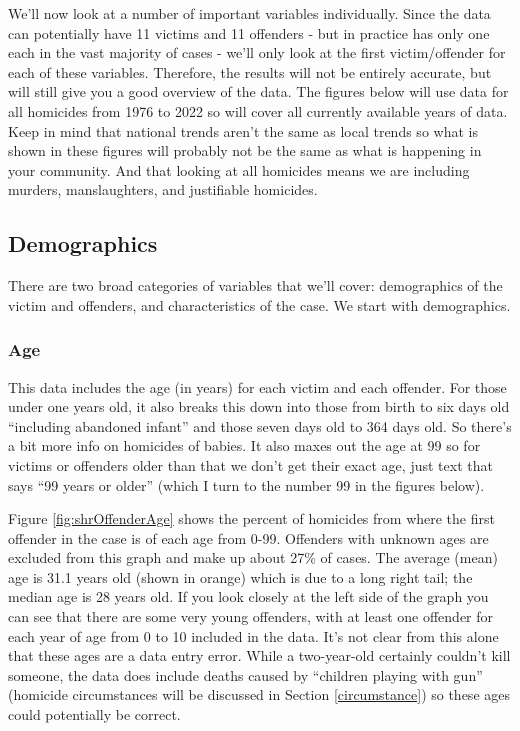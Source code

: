 \documentclass[
  12pt,
  openany]{book}
\begin{document}
We'll now look at a number of important variables individually. Since the data can potentially have 11 victims and 11 offenders - but in practice has only one each in the vast majority of cases - we'll only look at the first victim/offender for each of these variables. Therefore, the results will not be entirely accurate, but will still give you a good overview of the data. The figures below will use data for all homicides from 1976 to 2022 so will cover all currently available years of data. Keep in mind that national trends aren't the same as local trends so what is shown in these figures will probably not be the same as what is happening in your community. And that looking at all homicides means we are including murders, manslaughters, and justifiable homicides.

\subsection{Demographics}\label{demographics}

There are two broad categories of variables that we'll cover: demographics of the victim and offenders, and characteristics of the case. We start with demographics.

\subsubsection{Age}\label{age-1}

This data includes the age (in years) for each victim and each offender. For those under one years old, it also breaks this down into those from birth to six days old ``including abandoned infant'' and those seven days old to 364 days old. So there's a bit more info on homicides of babies. It also maxes out the age at 99 so for victims or offenders older than that we don't get their exact age, just text that says ``99 years or older'' (which I turn to the number 99 in the figures below).

Figure \ref{fig:shrOffenderAge} shows the percent of homicides from where the first offender in the case is of each age from 0-99. Offenders with unknown ages are excluded from this graph and make up about 27\% of cases. The average (mean) age is 31.1 years old (shown in orange) which is due to a long right tail; the median age is 28 years old. If you look closely at the left side of the graph you can see that there are some very young offenders, with at least one offender for each year of age from 0 to 10 included in the data. It's not clear from this alone that these ages are a data entry error. While a two-year-old certainly couldn't kill someone, the data does include deaths caused by ``children playing with gun'' (homicide circumstances will be discussed in Section \ref{circumstance}) so these ages could potentially be correct.
\end{document}
